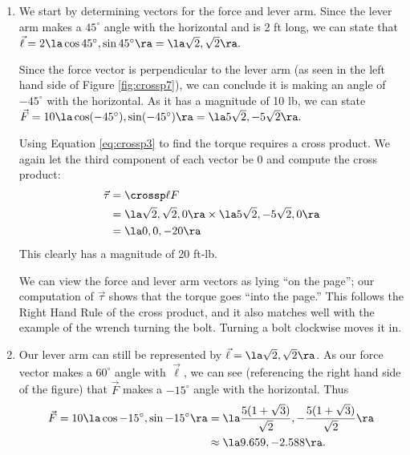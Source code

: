 {\begin{enumerate}
	\item We start by determining vectors for the force and lever arm. Since the lever arm makes a $45^\circ$ angle with the horizontal and is 2 ft long, we can state that $\vec \ell = 2\la \cos 45^\circ,\sin 45^\circ\ra = \la \sqrt2,\sqrt2\ra.$
	
	Since the force vector is perpendicular to the lever arm (as seen in the left hand side of Figure \ref{fig:crossp7}), we can conclude it is making an angle of $-45^\circ$ with the horizontal. As it has a magnitude of 10 lb, we can state $\vec F = 10\la \cos (-45^\circ), \sin(-45^\circ)\ra = \la 5\sqrt2,-5\sqrt2\ra.$
	
	Using Equation \eqref{eq:crossp3} to find the torque requires a cross product. We again let the third component of each vector be 0  and compute the cross product:
	\begin{align*}
	\vec\tau &= \crossp \ell F \\
				&= \la \sqrt2,\sqrt2,0\ra \times \la 5\sqrt2,-5\sqrt2,0\ra \\
				&= \la 0,0,-20\ra
	\end{align*}
	This clearly has a magnitude of 20 ft-lb.
	
	We can view the force and lever arm vectors as lying ``on the page''; our computation of $\vec\tau$ shows that the torque goes ``into the page.'' This follows the Right Hand Rule of the cross product, and it also matches well with the example of the wrench turning the bolt. Turning a bolt clockwise moves it in.
	
	\item		Our lever arm can still be represented by $\vec \ell = \la \sqrt2,\sqrt2\ra$. As our force vector makes a $60^\circ$ angle with $\vec \ell$, we can see (referencing the right hand side of the figure) that $\vec F$ makes a $-15^\circ$ angle with the horizontal. Thus 
	\begin{align*}
	\vec F = 10\la \cos-15^\circ,\sin-15^\circ\ra &= \la \frac{5(1+\sqrt3)}{\sqrt2},-\frac{5(1+\sqrt3)}{\sqrt2}\ra \\
	&\approx \la 9.659,-2.588\ra.\end{align*}
	

\end{enumerate}}
